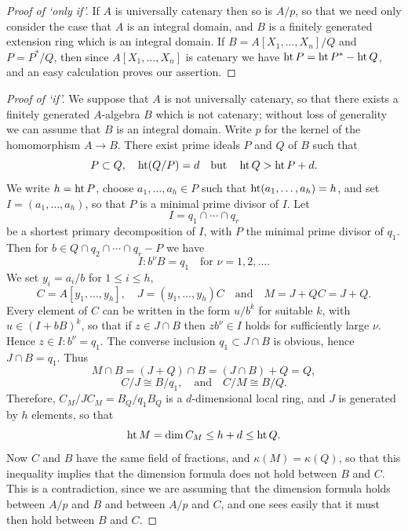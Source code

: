 \begin{proof}[Proof of `only if']
If $A$ is universally catenary then so is $A/p$, so that we
need only consider the case that $A$ is an integral domain, and $B$ is a finitely
generated extension ring which is an integral domain. If
$B = A[X_1, \ldots, X_n]/Q$ and $P = P^*/Q$, then since $A[X_1, \ldots, X_n]$ is catenary
we have $\operatorname{ht} P = \operatorname{ht} P^* - \operatorname{ht} Q$, and an easy calculation proves our assertion.
\end{proof}

\begin{proof}[Proof of `if']
We suppose that $A$ is not universally catenary, so that there
exists a finitely generated $A$-algebra $B$ which is not catenary; without loss
of generality we can assume that $B$ is an integral domain. Write $p$ for the
kernel of the homomorphism $A \to B$. There exist prime ideals $P$ and $Q$
of $B$ such that
\[
  P \subset Q, \quad \operatorname{ht}(Q/P) = d \quad \text{but} \quad \operatorname{ht} Q > \operatorname{ht} P + d.
\]
We write $h = \operatorname{ht} P$, choose $a_1, \ldots, a_h \in P$ such that $\operatorname{ht}(a_1, \ldots, a_h) = h$, and
set $I = (a_1, \ldots, a_h)$, so that $P$ is a minimal prime divisor of $I$. Let
\[
  I = q_1 \cap \cdots \cap q_r
\]
be a shortest primary decomposition of $I$, with $P$ the minimal prime
divisor of $q_1$. Then for $b \in Q \cap q_2 \cap \cdots \cap q_r - P$ we have
\[
  I:b^\nu B = q_1 \quad \text{for } \nu = 1, 2, \ldots.
\]
We set $y_i = a_i/b$ for $1 \le i \le h$,
\[
  C = A[y_1, \ldots, y_h], \quad J = (y_1, \ldots, y_h)C \quad \text{and} \quad M = J + QC = J + Q.
\]
Every element of $C$ can be written in the form $u/b^k$ for suitable $k$, with
$u \in (I + bB)^k$, so that if $z \in J \cap B$ then $zb^\nu \in I$ holds for sufficiently large
$\nu$. Hence $z \in I:b^\nu = q_1$. The converse inclusion $q_1 \subset J \cap B$ is obvious, hence
$J \cap B = q_1$. Thus
\[
  M \cap B = (J + Q) \cap B = (J \cap B) + Q = Q,
\]
\[
  C/J \cong B/q_1, \quad \text{and} \quad C/M \cong B/Q.
\]
Therefore, $C_M/JC_M = B_Q/q_1B_Q$ is a $d$-dimensional local ring, and $J$ is
generated by $h$ elements, so that
\[
  \operatorname{ht} M = \dim C_M \le h + d \le \operatorname{ht} Q.
\]
Now $C$ and $B$ have the same field of fractions, and $\kappa(M) = \kappa(Q)$, so that
this inequality implies that the dimension formula does not hold between
$B$ and $C$. This is a contradiction, since we are assuming that the dimension
formula holds between $A/p$ and $B$ and between $A/p$ and $C$, and one sees
easily that it must then hold between $B$ and $C$.
\end{proof}

